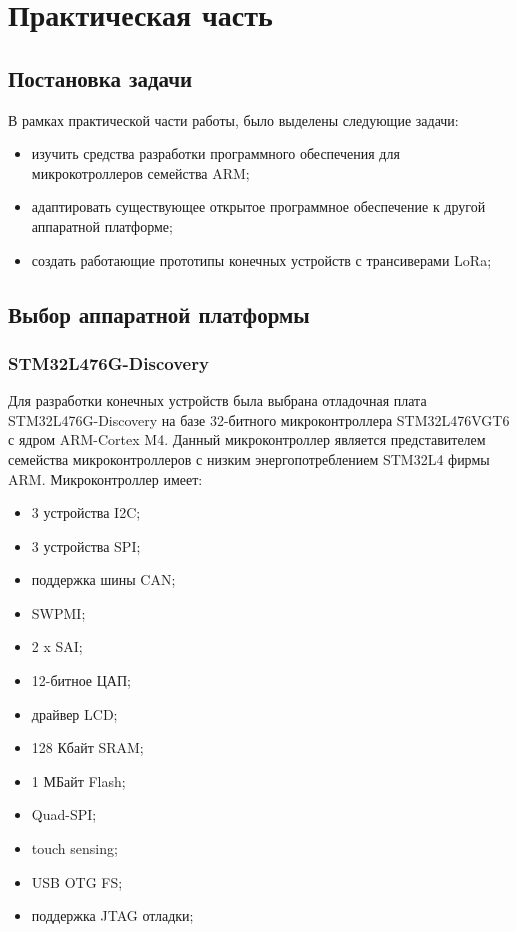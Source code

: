 \chapter{Практическая часть}
\label{cha:pract}

\section{Постановка задачи}

В рамках практической части работы, было выделены следующие задачи:

\begin{itemize}
 \item изучить средства разработки программного обеспечения для микрокотроллеров семейства ARM;
 \item адаптировать существующее открытое программное обеспечение к другой аппаратной платформе;
 \item создать работающие прототипы конечных устройств с трансиверами 
LoRa\texttrademark;
\end{itemize}

\section{Выбор аппаратной платформы}

\subsection{STM32L476G-Discovery}

Для разработки конечных устройств была выбрана отладочная плата 
STM32L476G-Discovery на базе 32-битного микроконтроллера STM32L476VGT6 с ядром 
ARM-Cortex M4.
Данный микроконтроллер является представителем семейства микроконтроллеров с 
низким энергопотреблением STM32L4 фирмы ARM.
Микроконтроллер имеет:
\begin{itemize}
 \item 3 устройства I2C;
 \item 3 устройства SPI;
 \item поддержка шины CAN;
 \item SWPMI;
 \item 2 x SAI;
 \item 12-битное ЦАП;
 \item драйвер LCD;
 \item 128 Кбайт SRAM;
 \item 1 МБайт Flash;
 \item Quad-SPI;
 \item touch sensing;
 \item USB OTG FS;
 \item поддержка JTAG отладки;
\end{itemize}

